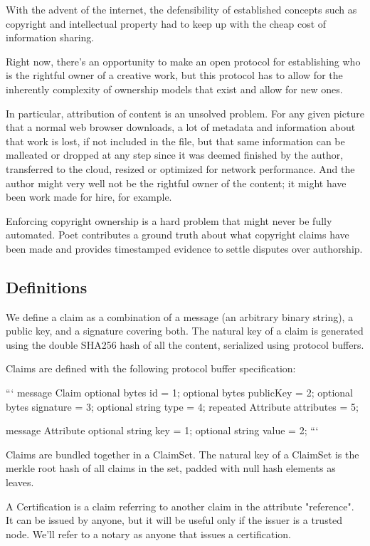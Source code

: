 \documentclass[12pt]{article}
\begin{document}
With the advent of the internet, the defensibility of established concepts
such as copyright and intellectual property
had to keep up with the cheap cost of information sharing.

Right now, there's an opportunity to make an open protocol for establishing
who is the rightful owner of a creative work, but this protocol has to allow
for the inherently complexity of ownership models that exist and allow for new ones.

In particular, attribution of content is an unsolved problem.
For any given picture that a normal web browser downloads, a lot of metadata and information about that work is lost, if not included in the file, but that same information can be malleated or dropped at any step since it was deemed finished by the author, transferred to the cloud, resized or optimized for network performance. And the author might very well not be the rightful owner of the content; it might have been work made for hire, for example.

Enforcing copyright ownership is a hard problem that might never be fully automated. Poet contributes a ground truth about what copyright claims have been made and provides timestamped evidence to settle disputes over authorship. 

\subsection{Definitions}

We define a claim as a combination of a message (an arbitrary binary string), a public key, and a signature covering both. The natural key of a claim is generated using the double SHA256 hash of all the content, serialized using protocol buffers.

Claims are defined with the following protocol buffer specification:

```
message Claim {
      optional bytes id = 1;
      optional bytes publicKey = 2;
      optional bytes signature = 3;
      optional string type = 4;
      repeated Attribute attributes = 5;
}

message Attribute {
      optional string key = 1;
      optional string value = 2;
}
```

Claims are bundled together in a ClaimSet. The natural key of a ClaimSet is the merkle root hash of all claims in the set, padded with null hash elements as leaves. 

A Certification is a claim referring to another claim in the attribute "reference". It can be issued by anyone, but it will be useful only if the issuer is a trusted node. We'll refer to a notary as anyone that issues a certification.
\end{document}
